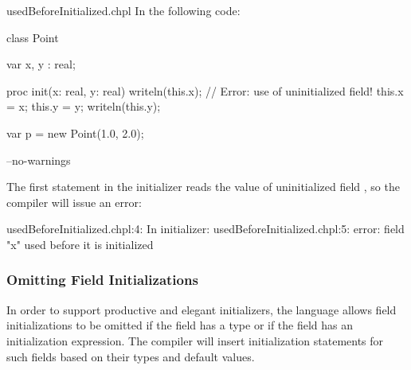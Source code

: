 \begin{chapelexample}{usedBeforeInitialized.chpl}
In the following code:
\begin{chapel}
class Point {
  var x, y : real;

  proc init(x: real, y: real) {
    writeln(this.x); // Error: use of uninitialized field!
    this.x = x;
    this.y = y;
    writeln(this.y);
  }
}
var p = new Point(1.0, 2.0);
\end{chapel}
\begin{chapelcompopts}
--no-warnings
\end{chapelcompopts}

The first statement in the initializer reads the value of uninitialized field
, so the compiler will issue an error:

\begin{chapelprintoutput}{}
usedBeforeInitialized.chpl:4: In initializer:
usedBeforeInitialized.chpl:5: error: field "x" used before it is initialized
\end{chapelprintoutput}

\end{chapelexample}

\subsubsection{Omitting Field Initializations}
\label{Omitting_Field_Initializations}

In order to support productive and elegant initializers, the language allows
field initializations to be omitted if the field has a type or if the field has
an initialization expression. The compiler will insert initialization
statements for such fields based on their types and default values.

